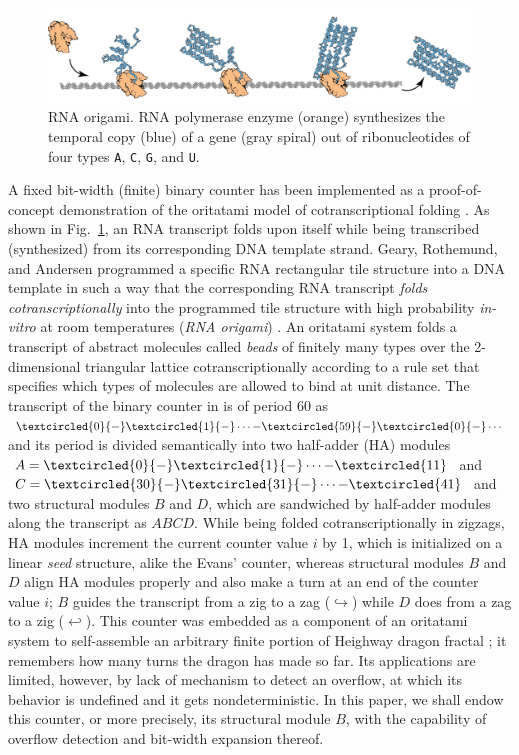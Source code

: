 \documentclass[twocolumn]{svjour3}
\begin{document}
\begin{figure}[tb]
\centering
\includegraphics[width=\linewidth]{rna_origami.pdf}
\caption{RNA origami. RNA polymerase enzyme (orange) synthesizes the temporal copy (blue) of a gene (gray spiral) out of ribonucleotides of four types {\tt A}, {\tt C}, {\tt G}, and {\tt U}.}
\label{fig:rna_origami}
\end{figure}

A fixed bit-width (finite) binary counter has been implemented as a proof-of-concept demonstration of the oritatami model of cotranscriptional folding \cite{GeMeScSe2019}. 
As shown in Fig.~\ref{fig:rna_origami}, an RNA transcript folds upon itself while being transcribed (synthesized) from its corresponding DNA template strand. 
Geary, Rothemund, and Andersen programmed a specific RNA rectangular tile structure into a DNA template in such a way that the corresponding RNA transcript \textit{folds cotranscriptionally} into the programmed tile structure with high probability \textit{in-vitro} at room temperatures (\textit{RNA origami}) \cite{GearyRothemundAndersen2014}. 
An oritatami system folds a transcript of abstract molecules called \textit{beads} of finitely many types over the 2-dimensional triangular lattice cotranscriptionally according to a rule set that specifies which types of molecules are allowed to bind at  unit distance. 
The transcript of the binary counter in \cite{GeMeScSe2019} is of period 60 as 
$\textcircled{\scriptsize 0}{-}\textcircled{\scriptsize 1}{-} \cdots {-}\textcircled{\scriptsize 59}{-}\textcircled{\scriptsize 0}{-}\cdots$ and its period is divided semantically into two half-adder (HA) modules $A = \textcircled{\scriptsize 0}{-}\textcircled{\scriptsize 1}{-} \cdots {-}\textcircled{\scriptsize 11}$ and $C = \textcircled{\scriptsize 30}{-}\textcircled{\scriptsize 31}{-} \cdots {-}\textcircled{\scriptsize 41}$ and two structural modules $B$ and $D$, which are sandwiched by half-adder modules along the transcript as $ABCD$.
While being folded cotranscriptionally in zigzags, HA modules increment the current counter value $i$ by 1, which is initialized on a linear \textit{seed} structure, alike the Evans' counter, whereas structural modules $B$ and $D$ align HA modules properly and also make a turn at an end of the counter value $i$; $B$ guides the transcript from a zig to a zag ($\hookrightarrow$) while $D$ does from a zag to a zig ($\hookleftarrow$). 
This counter was embedded as a component of an oritatami system to self-assemble an arbitrary finite portion of Heighway dragon fractal \cite{MasudaSekiUbukata2018}; it remembers how many turns the dragon has made so far. 
Its applications are limited, however, by lack of mechanism to detect an overflow, at which its behavior is undefined and it gets nondeterministic. 
In this paper, we shall endow this counter, or more precisely, its structural module $B$, with the capability of overflow detection and bit-width expansion thereof. 
\end{document}
